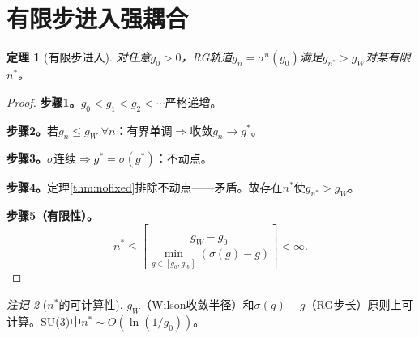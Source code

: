 \documentclass[12pt,a4paper]{article}
\theoremstyle{plain}
\newtheorem{theorem}{定理}[section]\newtheorem{lemma}[theorem]{引理}\newtheorem{corollary}[theorem]{推论}\newtheorem{proposition}[theorem]{命题}
\theoremstyle{definition}\newtheorem{definition}[theorem]{定义}
\theoremstyle{remark}\newtheorem{remark}[theorem]{注记}
\begin{document}
\section{有限步进入强耦合}\label{sec:finitestep}
\begin{theorem}[有限步进入]\label{thm:finitestep}
对任意$g_0>0$，RG轨道$g_n=\sigma^n(g_0)$满足$g_{n^*}>g_W$对某有限$n^*$。
\end{theorem}
\begin{proof}
\textbf{步骤1。}$g_0<g_1<g_2<\cdots$严格递增。

\textbf{步骤2。}若$g_n\leq g_W\;\forall n$：有界单调$\Rightarrow$收敛$g_n\to g^*$。

\textbf{步骤3。}$\sigma$连续$\Rightarrow g^*=\sigma(g^*)$：不动点。

\textbf{步骤4。}定理\ref{thm:nofixed}排除不动点——矛盾。故存在$n^*$使$g_{n^*}>g_W$。

\textbf{步骤5（有限性）。}
\begin{equation}\label{eq:nstar}
n^*\leq\left\lceil\frac{g_W-g_0}{\min_{g\in[g_0,g_W]}(\sigma(g)-g)}\right\rceil<\infty.
\end{equation}
\end{proof}
\begin{remark}[$n^*$的可计算性]
$g_W$（Wilson收敛半径）和$\sigma(g)-g$（RG步长）原则上可计算。SU(3)中$n^*\sim O(\ln(1/g_0))$。
\end{remark}
\end{document}
